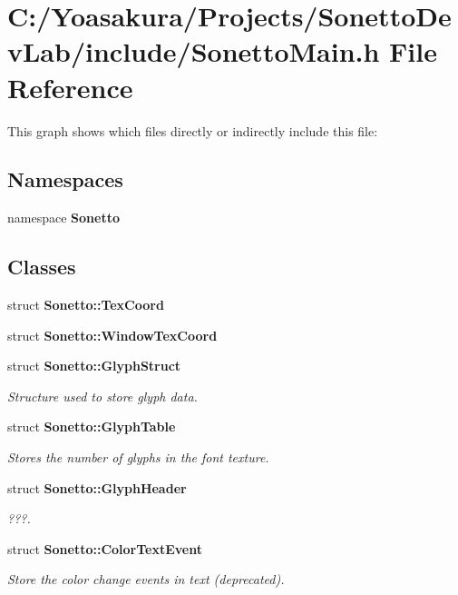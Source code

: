 \section{C:/Yoasakura/Projects/SonettoDevLab/include/SonettoMain.h File Reference}
\label{_sonetto_main_8h}


This graph shows which files directly or indirectly include this file:\subsection*{Namespaces}
\begin{CompactItemize}
\item 
namespace {\bf Sonetto}
\end{CompactItemize}
\subsection*{Classes}
\begin{CompactItemize}
\item 
struct {\bf Sonetto::TexCoord}
\item 
struct {\bf Sonetto::WindowTexCoord}
\item 
struct {\bf Sonetto::GlyphStruct}
\begin{CompactList}\small\item\em Structure used to store glyph data. \item\end{CompactList}\item 
struct {\bf Sonetto::GlyphTable}
\begin{CompactList}\small\item\em Stores the number of glyphs in the font texture. \item\end{CompactList}\item 
struct {\bf Sonetto::GlyphHeader}
\begin{CompactList}\small\item\em ???. \item\end{CompactList}\item 
struct {\bf Sonetto::ColorTextEvent}
\begin{CompactList}\small\item\em Store the color change events in text (deprecated). \item\end{CompactList}\end{CompactItemize}
